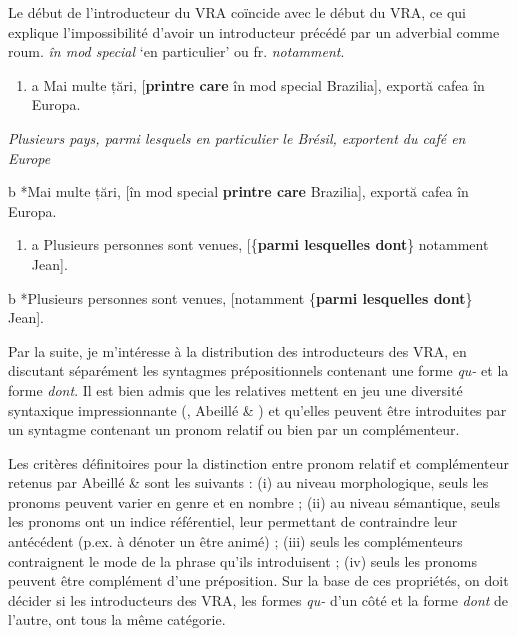 Le début de l'introducteur du VRA coïncide avec le début du VRA, ce qui explique l'impossibilité d'avoir un introducteur précédé par un adverbial comme roum. \textit{în mod special} `en particulier' ou fr. \textit{notamment}.   


\begin{enumerate}
\item \label{bkm:Ref296073257}a  Mai multe țări, [\textbf{printre care} în mod special Brazilia], exportă cafea în Europa. 


\end{enumerate}
{\itshape
Plusieurs pays, parmi lesquels en particulier le Brésil, exportent du café en Europe}

  b  *Mai multe țări, [în mod special \textbf{printre care} Brazilia], exportă cafea în Europa.


\begin{enumerate}
\item \label{bkm:Ref296073260}a  Plusieurs personnes sont venues, [\{\textbf{parmi lesquelles {\textbar} dont}\} notamment Jean].


\end{enumerate}
  b  *Plusieurs personnes sont venues, [notamment \{\textbf{parmi lesquelles {\textbar} dont}\} Jean].

Par la suite, je m'intéresse à la distribution des introducteurs des VRA, en discutant séparément les syntagmes prépositionnels contenant une forme \textit{qu-} et la forme \textit{dont}. Il est bien admis que les relatives mettent en jeu une diversité syntaxique impressionnante (\citet{Godard1988}, Abeillé \& \citet{Godard2006}) et qu'elles peuvent être introduites par un syntagme contenant un pronom relatif ou bien par un complémenteur.

Les critères définitoires pour la distinction entre pronom relatif et complémenteur retenus par Abeillé \& \citet{Godard2006} sont les suivants : (i) au niveau morphologique, seuls les pronoms peuvent varier en genre et en nombre ; (ii) au niveau sémantique, seuls les pronoms ont un indice référentiel, leur permettant de contraindre leur antécédent (p.ex. à dénoter un être animé) ; (iii) seuls les complémenteurs contraignent le mode de la phrase qu'ils introduisent ; (iv) seuls les pronoms peuvent être complément d'une préposition. Sur la base de ces propriétés, on doit décider si les introducteurs des VRA, les formes \textit{qu-} d'un côté et la forme \textit{dont} de l'autre, ont tous la même catégorie.  

